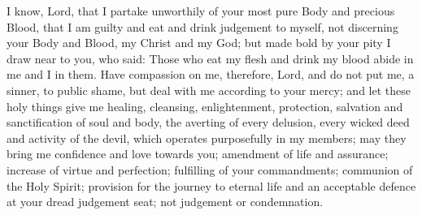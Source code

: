 
I know, Lord, that I partake unworthily of your most pure Body and precious Blood, that I am guilty and eat and drink judgement to myself, not discerning your Body and Blood, my Christ and my God; but made bold by your pity I draw near to you, who said: Those who eat my flesh and drink my blood abide in me and I in them. Have compassion on me, therefore, Lord, and do not put me, a sinner, to public shame, but deal with me according to your mercy; and let these holy things give me healing, cleansing, enlightenment, protection, salvation and sanctification of soul and body, the averting of every delusion, every wicked deed and activity of the devil, which operates purposefully in my members; may they bring me confidence and love towards you; amendment of life and assurance; increase of virtue and perfection; fulfilling of your commandments; communion of the Holy Spirit; provision for the journey to eternal life and an acceptable defence at your dread judgement seat; not judgement or condemnation.



